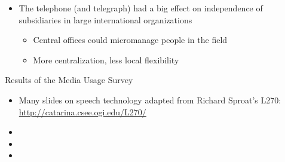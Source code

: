 \documentclass[a4paper,landscape,headrule,footrule,xetex]{foils}
\begin{document}







\begin{itemize}
\item The telephone (and telegraph) had a big effect on independence
  of subsidiaries in large international organizations \citep{Parkinson:1958}
  \begin{itemize}
  \item Central offices could micromanage people in the field
  \item More centralization, less local flexibility 
  \end{itemize}
\end{itemize}


Results of the Media Usage Survey


\begin{itemize}
\item Many slides on speech technology adapted from Richard Sproat's L270: 
  \\ \url{http://catarina.csee.ogi.edu/L270/}
\item {}
\item {}
\item {}
\end{itemize}




\end{document}
